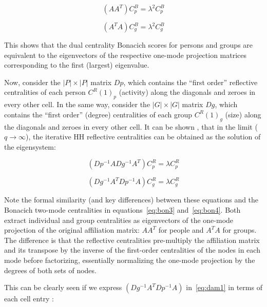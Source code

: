 \documentclass[a4paper,fleqn]{cas-sc}
\begin{document}
\begin{equation}
    \left(AA^T\right)C^B_p = \lambda^2 C^B_p
    \label{eq:bon3}
\end{equation}

\begin{equation}
    \left(A^TA\right)C^B_g = \lambda^2 C^B_g
    \label{eq:bon4}
\end{equation}

This shows that the dual centrality Bonacich scores for persons and groups are equivalent to the eigenvectors of the respective one-mode projection matrices corresponding to the first (largest) eigenvalue. 

Now, consider the $|P| \times |P|$ matrix $Dp$, which contains the ``first order'' reflective centralities of each person $C^R(1)_p$ (activity) along the diagonals and zeroes in every other cell. In the same way, consider the $|G| \times |G|$ matrix $Dg$, which contains the ``first order'' (degree) centralities of each group $C^R(1)_g$ (size) along the diagonals and zeroes in every other cell. It can be shown \citep{van2021correspondence}, that in the limit ($q \rightarrow \infty$), the iterative HH reflective centralities can be obtained as the solution of the eigensystem:

\begin{equation}
    \left(Dp^{-1}ADg^{-1}A^T\right)C^R_p = \lambda C^R_p
    \label{eq:dam1}
\end{equation}

\begin{equation}
    \left(Dg^{-1}A^TDp^{-1}A\right)C^R_g = \lambda C^R_g
    \label{eq:dam2}
\end{equation}

Note the formal similarity (and key differences) between these equations and the Bonacich two-mode centralities in equations~\ref{eq:bon3} and~\ref{eq:bon4}. Both extract individual and group centralities as eigenvectors of the one-mode projection of the original affiliation matrix: $AA^T$ for people and $A^TA$ for groups. The difference is that the reflective centralities pre-multiply the affiliation matrix and its transpose by the inverse of the first-order centralities of the nodes in each mode before factorizing, essentially normalizing the one-mode projection by the degrees of both sets of nodes. 

This can be clearly seen if we express $\left(Dg^{-1}A^TDp^{-1}A\right)$ in~\ref{eq:dam1} in terms of each cell entry \cite[eq. 4]{mealy2019interpreting}:
\end{document}
